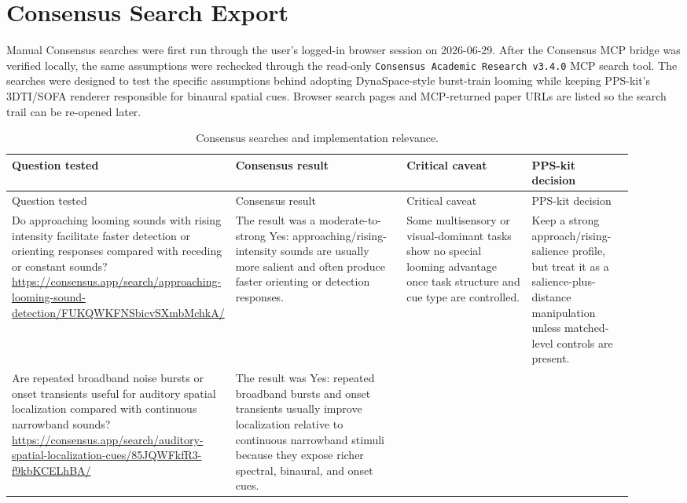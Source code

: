 \section*{Consensus Search Export}

Manual Consensus searches were first run through the user's logged-in browser session on 2026-06-29. After the Consensus MCP bridge was verified locally, the same assumptions were rechecked through the read-only \texttt{Consensus Academic Research v3.4.0} MCP search tool. The searches were designed to test the specific assumptions behind adopting DynaSpace-style burst-train looming while keeping PPS-kit's 3DTI/SOFA renderer responsible for binaural spatial cues. Browser search pages and MCP-returned paper URLs are listed so the search trail can be re-opened later.

\begin{longtable}{P{0.21\linewidth} P{0.31\linewidth} P{0.23\linewidth} P{0.17\linewidth}}
\caption{Consensus searches and implementation relevance.}\\
\toprule
Question tested & Consensus result & Critical caveat & PPS-kit decision\\
\midrule
\endfirsthead
\toprule
Question tested & Consensus result & Critical caveat & PPS-kit decision\\
\midrule
\endhead
Do approaching looming sounds with rising intensity facilitate faster detection or orienting responses compared with receding or constant sounds?
\newline\url{https://consensus.app/search/approaching-looming-sound-detection/FUKQWKFNSbicvSXmbMchkA/}
& The result was a moderate-to-strong Yes: approaching/rising-intensity sounds are usually more salient and often produce faster orienting or detection responses.
& Some multisensory or visual-dominant tasks show no special looming advantage once task structure and cue type are controlled.
& Keep a strong approach/rising-salience profile, but treat it as a salience-plus-distance manipulation unless matched-level controls are present.\\
\addlinespace
Are repeated broadband noise bursts or onset transients useful for auditory spatial localization compared with continuous narrowband sounds?
\newline\url{https://consensus.app/search/auditory-spatial-localization-cues/85JQWFkfR3-f9kbKCELhBA/}
& The result was Yes: repeated broadband bursts and onset transients usually improve localization relative to continuous narrowband stimuli because they expose richer spectral, binaural, and onset cues.

\end{longtable}
